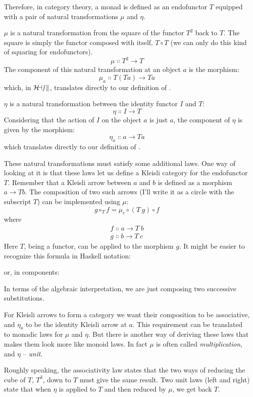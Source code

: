 Therefore, in category theory, a monad is defined as an endofunctor
$T$ equipped with a pair of natural transformations $\mu$ and $\eta$.

$\mu$ is a natural transformation from the square of the functor $T^2$
back to $T$. The square is simply the functor composed with
itself, $T \circ T$ (we can only do this kind of squaring for
endofunctors).
\[\mu \Colon T^2 \to T\]
The component of this natural transformation at an object $a$ is
the morphism:
\[\mu_a \Colon T (T a) \to T a\]
which, in $\mathcal{H\mkern-3mu ask}$, translates directly to our definition of
.

$\eta$ is a natural transformation between the identity functor $I$
and $T$:
\[\eta \Colon I \to T\]
Considering that the action of $I$ on the object $a$ is
just $a$, the component of $\eta$ is given by the morphism:
\[\eta_a \Colon a \to T a\]
which translates directly to our definition of .

These natural transformations must satisfy some additional laws. One way
of looking at it is that these laws let us define a Kleisli category for
the endofunctor $T$. Remember that a Kleisli arrow between
$a$ and $b$ is defined as a morphism
$a \to T b$. The composition of two such arrows
(I'll write it as a circle with the subscript $T$) can be
implemented using $\mu$:
\[g \circ_T f = \mu_c \circ (T\ g) \circ f\]
where
\begin{gather*}
f \Colon a \to T\ b \\
g \Colon b \to T\ c
\end{gather*}
Here $T$, being a functor, can be applied to the morphism
$g$. It might be easier to recognize this formula in Haskell
notation:

or, in components:

In terms of the algebraic interpretation, we are just composing two
successive substitutions.

For Kleisli arrows to form a category we want their composition to be
associative, and $\eta_a$ to be the identity Kleisli arrow at
$a$. This requirement can be translated to monadic laws for $\mu$ and
$\eta$. But there is another way of deriving these laws that makes them look
more like monoid laws. In fact $\mu$ is often called
\emph{multiplication}, and $\eta$ -- \emph{unit}.

Roughly speaking, the associativity law states that the two ways of
reducing the cube of $T$, $T^3$, down to $T$ must
give the same result. Two unit laws (left and right) state that when
$\eta$ is applied to $T$ and then reduced by $\mu$, we
get back $T$.


